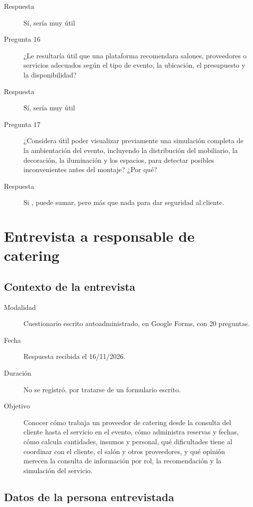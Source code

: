 \begin{description}
    \item[Respuesta] Sí, sería muy útil
    \item[Pregunta 16] ¿Le resultaría útil que una plataforma recomendara salones, proveedores o servicios adecuados según el tipo de evento, la ubicación, el presupuesto y la disponibilidad?
    \item[Respuesta] Sí, sería muy útil
    \item[Pregunta 17] ¿Considera útil poder visualizar previamente una simulación completa de la ambientación del evento, incluyendo la distribución del mobiliario, la decoración, la iluminación y los espacios, para detectar posibles inconvenientes antes del montaje? ¿Por qué?
    \item[Respuesta] Si , puede sumar, pero más que nada para dar seguridad al.cliente.
\end{description}

\section{Entrevista a responsable de catering}

\subsection{Contexto de la entrevista}

\begin{description}
    \item[Modalidad] Cuestionario escrito autoadministrado, en Google Forms, con 20 preguntas.
    \item[Fecha] Respuesta recibida el 16/11/2026.
    \item[Duración] No se registró, por tratarse de un formulario escrito.
    \item[Objetivo] Conocer cómo trabaja un proveedor de catering desde la consulta del cliente hasta el servicio en el evento, cómo administra reservas y fechas, cómo calcula cantidades, insumos y personal, qué dificultades tiene al coordinar con el cliente, el salón y otros proveedores, y qué opinión merecen la consulta de información por rol, la recomendación y la simulación del servicio.
\end{description}

\subsection{Datos de la persona entrevistada}

